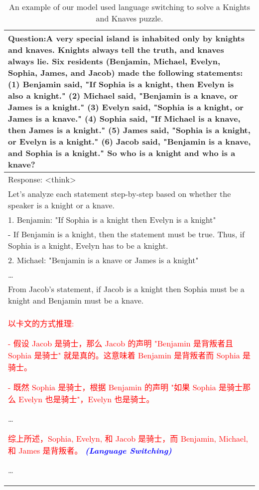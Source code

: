 \begin{table}[H]
\centering
\fontsize{9.5}{10}\selectfont
\begin{tabular}{p{14cm}}
\toprule 
Question:A very special island is inhabited only by knights and knaves. Knights always tell the truth, and knaves
always lie. Six residents (Benjamin, Michael, Evelyn, Sophia, James, and Jacob) made the following statements: (1) Benjamin said, "If Sophia is a knight, then Evelyn is also a knight." (2) Michael said, "Benjamin is a knave, or James is a knight." (3) Evelyn said, "Sophia is a knight, or James is a knave." (4) Sophia said, "If Michael is a knave, then James is a knight." (5) James said, "Sophia is a knight, or Evelyn is a knight." (6) Jacob said, "Benjamin is a knave, and Sophia is a knight." So who is a knight and who is a knave? \\
\midrule
Response: <think> \\
Let's analyze each statement step-by-step based on whether the speaker is a knight or a knave. \\

1. Benjamin: "If Sophia is a knight then Evelyn is a knight" \\
   - If Benjamin is a knight, then the statement must be true. Thus, if Sophia is a knight, Evelyn has to be a knight. \\

2. Michael: "Benjamin is a knave or James is a knight" \\
\ldots \\

From Jacob's statement, if Jacob is a knight then Sophia must be a knight and Benjamin must be a knave. \\

\begin{CJK*}{UTF8}{gbsn}
\fontsize{8.5}{10}\selectfont
\textcolor{red}{以卡文的方式推理: }

\textcolor{red}{- 假设 Jacob 是骑士，那么 Jacob 的声明 "Benjamin 是背叛者且 Sophia 是骑士" 就是真的。这意味着 Benjamin 是背叛者而 Sophia 是骑士。}

\textcolor{red}{- 既然 Sophia 是骑士，根据 Benjamin 的声明 "如果 Sophia 是骑士那么 Evelyn 也是骑士"，Evelyn 也是骑士。}

\ldots

\textcolor{red}{综上所述，Sophia, Evelyn, 和 Jacob 是骑士，而 Benjamin, Michael, 和 James 是背叛者。 }\textcolor{blue}{\textit{\textbf{ (Language Switching)}}}

\end{CJK*}
\ldots \\
\hline
\end{tabular}
\vspace{5mm}
\caption{An example of our model used language switching to solve a Knights and Knaves puzzle.}
\end{table}




